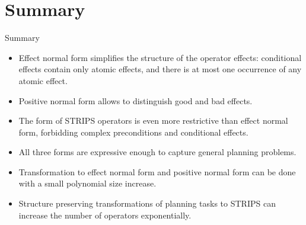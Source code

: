 \documentclass{gkibeamer}
\begin{document}
\section*{Summary}
\begin{frame}{Summary}
  \begin{itemize}
  \item \alert{Effect normal form} simplifies the structure of 
    the operator effects: conditional effects contain only atomic effects, and
    there is at most one occurrence of any atomic effect.
  \item \alert{Positive normal form} allows to distinguish good
    and bad effects.
  \item The form of \alert{STRIPS operators} is even more restrictive than
    effect normal form, forbidding complex preconditions and conditional
    effects.
  \item All three forms are expressive enough to capture general planning
    problems.
  \item Transformation to effect normal form and
    positive normal form can be done with a small polynomial size increase.
  \item Structure preserving transformations of planning tasks to 
    STRIPS can increase the number of operators exponentially.
  \end{itemize}
\end{frame}
\end{document}

